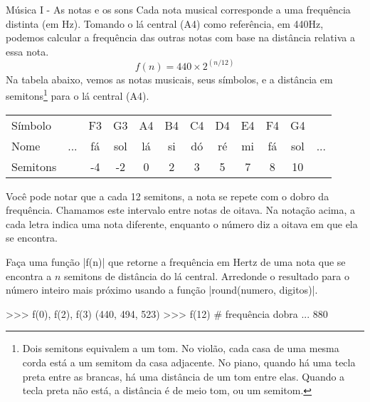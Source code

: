 	\begin{problem}[p:musica:1]{Música I - As notas e os sons}
		Cada nota musical corresponde a uma frequência distinta (em Hz). Tomando o lá central (A4) como referência, em 440Hz, podemos calcular a frequência das outras notas com base na distância relativa a essa nota.
        $$f(n) = 440 \times 2^{(n/12)}$$
        Na tabela abaixo, vemos as notas musicais, seus símbolos, e a distância em semitons\footnote{Dois semitons equivalem a um tom. No violão, cada casa de uma mesma corda está a um semitom da casa adjacente. No piano, quando há uma tecla preta entre as brancas, há uma distância de um tom entre elas. Quando a tecla preta não está, a distância é de meio tom, ou um semitom.} para o lá central (A4).

		\begin{center}
            \begin{tabular}{|l|c c c c c c c c c c c|}
                \hline
                Símbolo &  & F3 & G3 & A4 & B4 & C4 & D4 & E4 & F4 & G4 & \\
                Nome & ... & fá & sol & lá & si & dó & ré & mi & fá & sol &  ... \\
                Semitons &  & -4 & -2 & 0 & 2 & 3 & 5 & 7 & 8 & 10 & \\
                \hline
            \end{tabular}
        \end{center}

		Você pode notar que a cada 12 semitons, a nota se repete com o dobro da frequência. Chamamos este intervalo entre notas de oitava. Na notação acima, a cada letra indica uma nota diferente, enquanto o número diz a oitava em que ela se encontra. \par
        
		\proposal
        Faça uma função |f(n)| que retorne a frequência em Hertz de uma nota que se encontra a $n$ semitons de distância do lá central. Arredonde o resultado para o número inteiro mais próximo usando a função |round(numero, digitos)|. \par
        
        \begin{lstpython}
	>>> f(0), f(2), f(3)
	(440, 494, 523)
	>>> f(12) # frequência dobra ...
	880
        \end{lstpython}
	\end{problem}

